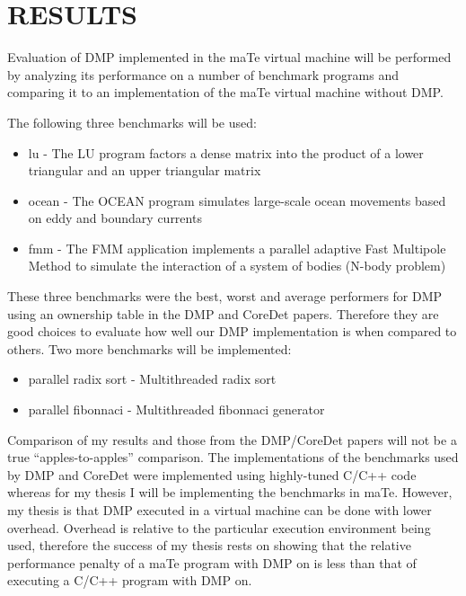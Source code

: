 \chapter{RESULTS}
\label{RESULTS}

Evaluation of DMP implemented in the maTe virtual machine will be
performed by analyzing its performance on a number of benchmark
programs and comparing it to an implementation of the maTe virtual
machine without DMP.

The following three benchmarks will be used:

\begin{itemize}
\item lu - The LU program factors a dense matrix into the product of a
  lower triangular and an upper triangular matrix

\item ocean - The OCEAN program simulates large-scale ocean movements
  based on eddy and boundary currents

\item fmm - The FMM application implements a parallel adaptive Fast
  Multipole Method to simulate the interaction of a system of bodies
  (N-body problem)
\end{itemize}

These three benchmarks were the best, worst and average performers for
DMP using an ownership table in the DMP and CoreDet papers.  Therefore
they are good choices to evaluate how well our DMP implementation is
when compared to others.  Two more benchmarks will be implemented:

\begin{itemize}
\item parallel radix sort - Multithreaded radix sort

\item parallel fibonnaci - Multithreaded fibonnaci generator
\end{itemize}

Comparison of my results and those from the DMP/CoreDet papers will
not be a true ``apples-to-apples'' comparison.  The implementations of
the benchmarks used by DMP \cite{dmp} and CoreDet \cite{coredet} were
implemented using highly-tuned C/C++ code whereas for my thesis I will
be implementing the benchmarks in maTe.  However, my thesis is that
DMP executed in a virtual machine can be done with lower overhead.
Overhead is relative to the particular execution environment being
used, therefore the success of my thesis rests on showing that the
relative performance penalty of a maTe program with DMP on is less
than that of executing a C/C++ program with DMP on.

